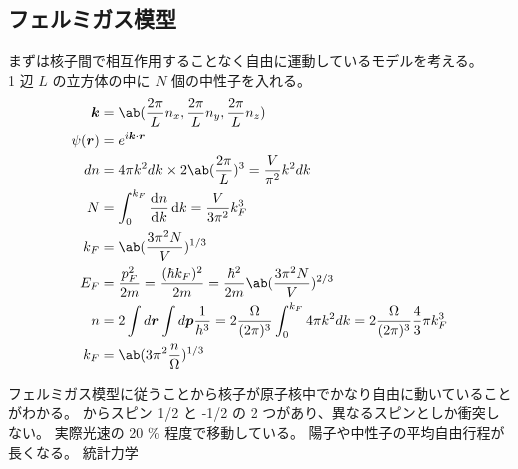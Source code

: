 \documentclass[uplatex,dvipdfmx,a4paper,11pt]{jlreq}
\newcommand{\rr}{\bm{r}}
\newcommand{\kk}{\bm{k}}
\newcommand{\pp}{\bm{p}}
\numberwithin{equation}{section}
\theoremstyle{definition}
\begin{document}
\subsection{フェルミガス模型}
まずは核子間で相互作用することなく自由に運動しているモデルを考える。 \\

1 辺 $L$ の立方体の中に $N$ 個の中性子を入れる。
\begin{align}
  \bm{k}    & = \ab(\frac{2\pi}{L}n_x, \frac{2\pi}{L}n_y, \frac{2\pi}{L}n_z)                                                                       \\
  \psi(\rr) & = e^{i\kk\cdot\rr}                                                                                                                   \\
  dn        & = 4\pi k^2dk \times 2 \ab(\frac{2\pi}{L})^3 = \frac{V}{\pi^2}k^2dk                                                                   \\
  N         & = \int_0^{k_F}\diff{n}{k}\dl{k} = \frac{V}{3\pi^2}k_F^3                                                                              \\
  k_F       & = \ab(\frac{3\pi^2 N}{V})^{1/3}                                                                                                      \\
  E_F       & = \frac{p_F^2}{2m} = \frac{(\hbar k_F)^2}{2m} = \frac{\hbar^2}{2m}\ab(\frac{3\pi^2 N}{V})^{2/3}                                      \\
  n         & = 2\int d\rr \int d\pp \frac{1}{h^3} = 2\frac{\Omega}{(2\pi)^3}\int_0^{k_F}4\pi k^2dk = 2\frac{\Omega}{(2\pi)^3}\frac{4}{3}\pi k_F^3 \\
  k_F       & = \ab(3\pi^2\frac{n}{\Omega})^{1/3}
\end{align}

フェルミガス模型に従うことから核子が原子核中でかなり自由に動いていることがわかる。
からスピン 1/2 と -1/2 の 2 つがあり、異なるスピンとしか衝突しない。
実際光速の 20 \% 程度で移動している。
陽子や中性子の平均自由行程が長くなる。
統計力学
\end{document}

